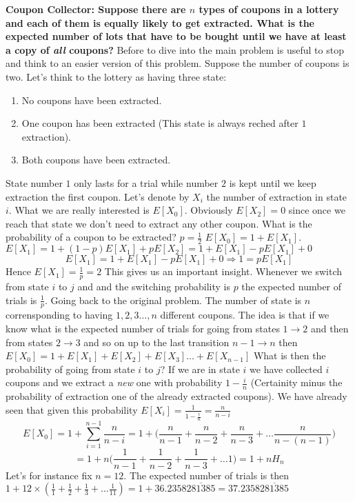 \begin{framed}
\begin{example}
\textbf{Coupon Collector: Suppose there are $n$ types of coupons in a lottery and each of them is equally likely to get extracted. What is the expected number of lots that have to be bought until we have at least a copy of \textit{all} coupons?}
Before to dive into the main problem is useful to stop and think to an easier version of this problem. Suppose the number of coupons is two. Let's think to the lottery as having three state:
\begin{enumerate}
	\item No coupons have been extracted.
	\item One coupon has been extracted (This state is always reched after $1$ extraction).
	\item Both coupons have been extracted. 
\end{enumerate}
State number $1$ only lasts for a trial while number $2$ is kept until we keep extraction the first coupon.
Let's denote by $X_i$ the number of extraction in state $i$. What we are really interested is $E[X_0]$. Obviously $E[X_2]=0$ since once we reach that state we don't need to extract any other coupon. What is the probability of a coupon to be extracted? $p=\frac{1}{2}$
$E[X_0] = 1 + E[X_1]$.  
$E[X_1] = 1 + (1-p)E[X_1] + pE[X_2] = 1+E[X_1]-pE[X_1]+0$
\[
E[X_1] =  1+E[X_1]-pE[X_1]+0 \Rightarrow 1 = pE[X_1]
\]
Hence $E[X_1] = \frac{1}{p} = 2$
This gives us an important insight.  Whenever we switch from state $i$ to $j$ and and the switching probability is $p$ the expected number of trials is $\frac{1}{p}$.
Going back to the original problem. The number of state is $n$ corrensponding to having $1,2,3 	\ldots, n$ different coupons. The idea is that if we know what is the expected number of trials for going from states $1 \rightarrow 2$ and then from states $2 \rightarrow 3$ and so on up to the last transition $n-1 \rightarrow n$ then $E[X_0] = 1 +  E[X_1] + E[X_2] +E[X_3] \ldots +E[X_{n-1}]$ What is then the probability of going from state $i$ to $j$? If we are in state $i$ we have collected $i$ coupons and we extract a \textit{new} one with probability $1 - \frac{i}{n}$ (Certainity minus the probability of extraction one of the already extracted coupons). We have already seen that given this probability $E[X_i] = \frac{1}{1 - \frac{i}{n}} = \frac{n}{n-i}$
\[
E[X_0] = 1+ \sum_{i=1}^{n-1} \frac{n}{n-i} = 1+ \Big(\frac{n}{n-1}+\frac{n}{n-2}+\frac{n}{n-3}+ \ldots \frac{n}{n-(n-1)}\Big)
\]
\[
= 1+n \Big(\frac{1}{n-1}+\frac{1}{n-2}+\frac{1}{n-3}+ \ldots 1 \Big) = 1 + nH_n
\]
Let's for instance fix $n=12$. The expected number of trials is then $1+12 \times (\frac{1}{1}+\frac{1}{2}+\frac{1}{3}+\ldots \frac{1}{11}) = 1+ 36.2358\overline{281385} =  37.2358\overline{281385}$ 
\end{example}


\end{framed}

